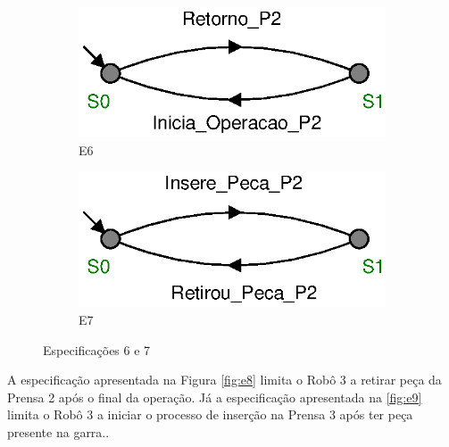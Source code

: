 \begin{figure}[H]%
  \centering
  \begin{subfigure}{0.45\textwidth}
      \centering
      \includegraphics[width=\textwidth]{imagens/E6.eps}
      \caption{E6}
      \label{fig:e6}
  \end{subfigure}
  \hfill
  \begin{subfigure}{0.45\textwidth}
      \centering
      \includegraphics[width=\textwidth]{imagens/E7.eps}
      \caption{E7}
      \label{fig:e7}
  \end{subfigure}
  \caption{Especificações 6 e 7}
  \label{fig:e67}
\end{figure}

A especificação apresentada na Figura \ref{fig:e8} limita o Robô 3 a retirar peça da Prensa 2 após o final da operação.
Já a especificação apresentada na \ref{fig:e9} limita o Robô 3 a iniciar o processo de inserção na Prensa 3 após ter peça presente na garra..

